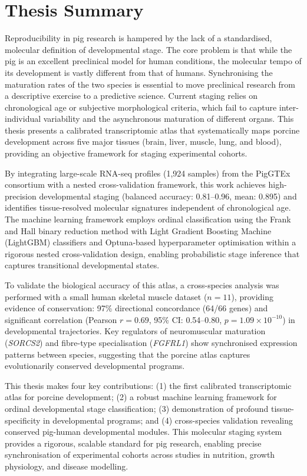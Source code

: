 \markboth{}{}
\chapter*{Thesis Summary}

Reproducibility in pig research is hampered by the lack of a standardised, molecular definition of developmental stage. The core problem is that while the pig is an excellent preclinical model for human conditions, the molecular tempo of its development is vastly different from that of humans. Synchronising the maturation rates of the two species is essential to move preclinical research from a descriptive exercise to a predictive science. Current staging relies on chronological age or subjective morphological criteria, which fail to capture inter-individual variability and the asynchronous maturation of different organs. This thesis presents a calibrated transcriptomic atlas that systematically maps porcine development across five major tissues (brain, liver, muscle, lung, and blood), providing an objective framework for staging experimental cohorts.

By integrating large-scale RNA-seq profiles (1,924 samples) from the PigGTEx consortium with a nested cross-validation framework, this work achieves high-precision developmental staging (balanced accuracy: 0.81--0.96, mean: 0.895) and identifies tissue-resolved molecular signatures independent of chronological age. The machine learning framework employs ordinal classification using the Frank and Hall binary reduction method with Light Gradient Boosting Machine (LightGBM) classifiers and Optuna-based hyperparameter optimisation within a rigorous nested cross-validation design, enabling probabilistic stage inference that captures transitional developmental states.

To validate the biological accuracy of this atlas, a cross-species analysis was performed with a small human skeletal muscle dataset ($n = 11$), providing evidence of conservation: 97\% directional concordance (64/66 genes) and significant correlation (Pearson $r = 0.69$, 95\% CI: 0.54--0.80, $p = 1.09 \times 10^{-10}$) in developmental trajectories. Key regulators of neuromuscular maturation (\textit{SORCS2}) and fibre-type specialisation (\textit{FGFRL1}) show synchronised expression patterns between species, suggesting that the porcine atlas captures evolutionarily conserved developmental programs.

This thesis makes four key contributions: (1) the first calibrated transcriptomic atlas for porcine development; (2) a robust machine learning framework for ordinal developmental stage classification; (3) demonstration of profound tissue-specificity in developmental programs; and (4) cross-species validation revealing conserved pig-human developmental modules. This molecular staging system provides a rigorous, scalable standard for pig research, enabling precise synchronisation of experimental cohorts across studies in nutrition, growth physiology, and disease modelling.
